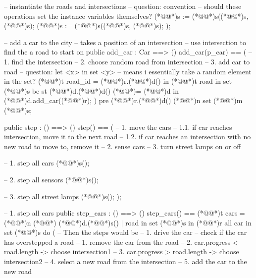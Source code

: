 \documentclass[a4paper]{article}
\begin{document}
\begin{vdm_al}
        -- instantiate the roads and intersections
        -- question: convention
        --           should these operations set the instance variables themselves?
        (*@@*)s := (*@@*)s((*@@*)s, (*@@*)s);
        (*@@*)s := (*@@*)s((*@@*)s, (*@@*)s);
    );

    -- add a car to the city
    -- takes a position of an intersection
    -- use intersection to find the a road to start on
    public add_car : Car ==> ()
    add_car(p_car) == (
        -- 1. find the intersection
        -- 2. choose random road from intersection
        -- 3. add car to road
        -- question: let <x> in set <y>
        --           means i essentially take a random element in the set?
        (*@@*)t road_id = (*@@*)r.(*@@*)d() in
            (*@@*)t road in set (*@@*)s be st (*@@*)d.(*@@*)d() (*@\vdmnotcovered{}@*)= (*@@*)d in
                (*@@*)d.add_car((*@@*)r);
    )
    pre (*@@*)r.(*@@*)d() (*@@*)n set (*@@*)m (*@@*)s;

    public step : () ==> ()
    step() == (
        -- 1. move the cars
        --    1.1. if car reaches intersection, move it to the next road
        --    1.2. if car reaches an intersection with no new road to move to, remove it
        -- 2. sense cars
        -- 3. turn street lamps on or off

        -- 1. step all cars
        (*@@*)s();

        -- 2. step all sensors
        (*@@*)s();
        
        -- 3. step all street lamps
        (*@@*)s();
    );

    -- 1. step all cars
    public step_cars : () ==> ()
    step_cars() ==
        (*@@*)t cars = (*@@*)n (*@\vdmnotcovered{}@*){
            (*@@*)d.(*@@*)s()
            | road in set (*@@*)s
        } in
            (*@@*)r all car in set (*@@*)s do (
                -- Then the steps would be
                -- 1. drive the car
                -- check if the car has overstepped a road
                --     1. remove the car from the road
                --     2. car.progress < road.length -> choose intersection1
                --     3. car.progress > road.length -> choose intersection2
                --     4. select a new road from the intersection
                --     5. add the car to the new road
                

\end{vdm_al}
\end{document}
